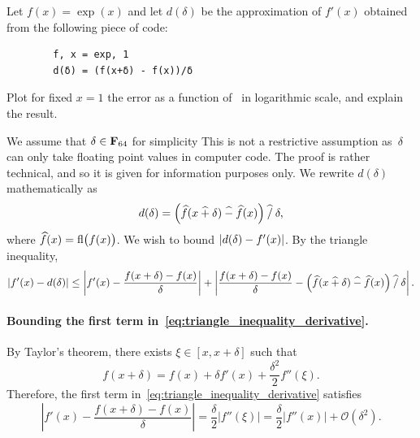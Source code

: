 \begin{compexercise}
    \label{exercise_differentiation}
    Let $f(x) = \exp(x)$ and let $d(\delta)$ be the approximation of $f'(x)$ obtained from the following piece of code:
    \begin{verbatim}
        f, x = exp, 1
        d(δ) = (f(x+δ) - f(x))/δ
    \end{verbatim}
    Plot for fixed $x = 1$ the error  as a function of~ in logarithmic scale,
    and explain the result.
\end{compexercise}
\begin{solution}
    We assume that $\delta \in \mathbf F_{64}$ for simplicity
    This is not a restrictive assumption
    as~$\delta$ can only take floating point values in computer code.
    The proof is rather technical, and so it is given for information purposes only.
    We rewrite $d(\delta)$ mathematically as
    \[
        d(\delta) = \Bigl(\widehat f(x \mathbin{\widehat +} \delta) \mathbin{\widehat -} \widehat f(x)\Bigr) \mathbin{\widehat /} \delta,
    \]
    where $\widehat f(x) = {\rm fl} \bigl(f(x)\bigr)$.
    We wish to bound $\lvert d(\delta) - f'(x)\rvert$.
    By the triangle inequality,
    \begin{equation}
        \label{eq:triangle_inequality_derivative}
        \lvert f'(x) - d(\delta)\rvert
        \leq \left\lvert f'(x) - \frac{f(x + \delta) - f(x)}{\delta} \right\rvert
        + \left\lvert \frac{f(x + \delta) - f(x)}{\delta} - \Bigl(\widehat f(x \mathbin{\widehat +} \delta) \mathbin{\widehat -} \widehat f(x)\Bigr) \mathbin{\widehat /} \delta \right\rvert.
    \end{equation}
    \paragraph{Bounding the first term in~\eqref{eq:triangle_inequality_derivative}.}
    By Taylor's theorem, there exists $\xi \in [x, x+\delta]$ such that
    \[
        f(x + \delta) = f(x) + \delta f'(x) + \frac{\delta^2}{2} f''(\xi).
    \]
    Therefore, the first term in~\eqref{eq:triangle_inequality_derivative} satisfies
    \[
        \left\lvert f'(x) - \frac{f(x + \delta) - f(x)}{\delta} \right\rvert
        = \frac{\delta}{2} \lvert f''(\xi) \rvert
        = \frac{\delta}{2} \lvert f''(x) \rvert + \mathcal O(\delta^2).
    \]


\end{solution}
